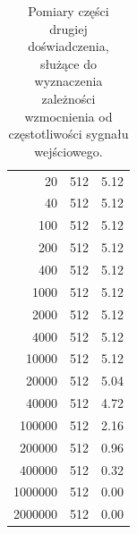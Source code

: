 \documentclass[11pt,a4paper]{article}
\begin{document}
\begin{table}[!htp]
\begin{minipage}{.6\linewidth}
\begin{center}
\begin{tabular}{|r|c|c|}
20                             & 512                                & 5.12                              \\
40                             & 512                                & 5.12                              \\
100                            & 512                                & 5.12                              \\
200                            & 512                                & 5.12                              \\
400                            & 512                                & 5.12                              \\
1000                           & 512                                & 5.12                              \\
2000                           & 512                                & 5.12                              \\
4000                           & 512                                & 5.12                              \\
10000                          & 512                                & 5.12                              \\
20000                          & 512                                & 5.04                              \\
40000                          & 512                                & 4.72                              \\
100000                         & 512                                & 2.16                              \\
200000                         & 512                                & 0.96                              \\
400000                         & 512                                & 0.32                              \\
1000000                        & 512                                & 0.00 
\\
2000000                        & 512                                & 0.00                                
\\
\hline
\end{tabular}
\caption{Pomiary części drugiej doświadczenia, służące do wyznaczenia zależności wzmocnienia od częstotliwości sygnału wejściowego.}
\label{czesc2}
\end{center}
\end{minipage}

\end{table}
\end{document}
